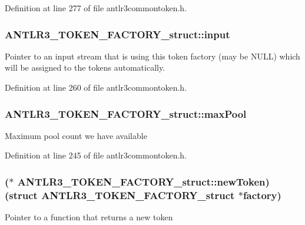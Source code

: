 Definition at line 277 of file antlr3commontoken.\-h.

\hypertarget{struct_a_n_t_l_r3___t_o_k_e_n___f_a_c_t_o_r_y__struct_a5eb7471ee5333de2b227ffea4efa6053}{
\subsubsection[{input}]{ A\-N\-T\-L\-R3\-\_\-\-T\-O\-K\-E\-N\-\_\-\-F\-A\-C\-T\-O\-R\-Y\-\_\-struct\-::input}}\label{struct_a_n_t_l_r3___t_o_k_e_n___f_a_c_t_o_r_y__struct_a5eb7471ee5333de2b227ffea4efa6053}
Pointer to an input stream that is using this token factory (may be N\-U\-L\-L) which will be assigned to the tokens automatically. 

Definition at line 260 of file antlr3commontoken.\-h.

\hypertarget{struct_a_n_t_l_r3___t_o_k_e_n___f_a_c_t_o_r_y__struct_a19bec4eaa4b7a97b302d44864e929263}{
\subsubsection[{max\-Pool}]{ A\-N\-T\-L\-R3\-\_\-\-T\-O\-K\-E\-N\-\_\-\-F\-A\-C\-T\-O\-R\-Y\-\_\-struct\-::max\-Pool}}\label{struct_a_n_t_l_r3___t_o_k_e_n___f_a_c_t_o_r_y__struct_a19bec4eaa4b7a97b302d44864e929263}
Maximum pool count we have available 

Definition at line 245 of file antlr3commontoken.\-h.

\hypertarget{struct_a_n_t_l_r3___t_o_k_e_n___f_a_c_t_o_r_y__struct_a111fabbe4ff4fd673d2bda2bc6e0165f}{
\subsubsection[{new\-Token}]{($\ast$ A\-N\-T\-L\-R3\-\_\-\-T\-O\-K\-E\-N\-\_\-\-F\-A\-C\-T\-O\-R\-Y\-\_\-struct\-::new\-Token)(struct {\bf A\-N\-T\-L\-R3\-\_\-\-T\-O\-K\-E\-N\-\_\-\-F\-A\-C\-T\-O\-R\-Y\-\_\-struct} $\ast$factory)}}\label{struct_a_n_t_l_r3___t_o_k_e_n___f_a_c_t_o_r_y__struct_a111fabbe4ff4fd673d2bda2bc6e0165f}
Pointer to a function that returns a new token 

